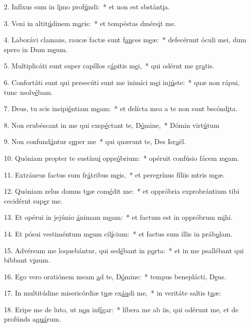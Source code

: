 2. Infíxus sum in l\uline{i}mo prof\uline{ú}ndi:~* et non est sbstánt\uline{i}a.\par 
3. Veni in altit\uline{ú}dinem m\uline{a}ris:~* et tempéstas dmérs\uline{i}t me.\par 
4. Laborávi clamans, raucæ factæ sunt f\uline{au}ces m\uline{e}æ:~* defecérunt óculi mei, dum spero in Dum m\uline{e}um.\par 
5. Multiplicáti sunt super capíllos c\uline{á}pitis m\uline{e}i,~* qui odérnt me gr\uline{a}tis.\par 
6. Confortáti sunt qui persecúti sunt me inimíci m\uline{e}i inj\uline{ú}ste:~* quæ non rápui, tunc xsolv\uline{é}bam.\par 
7. Deus, tu scis insipi\uline{é}ntiam m\uline{e}am:~* et delícta mea a te non sunt bscónd\uline{i}ta.\par 
8. Non erubéscant in me qui exsp\uline{é}ctant te, D\uline{ó}mine,~* Dómin virt\uline{ú}tum\par 
9. Non confund\uline{á}ntur s\uline{u}per me~* qui quærunt te, Des Isr\uline{a}ël.\par 
10. Quóniam propter te sustínu\uline{i} oppr\uline{ó}brium:~* opéruit confúsio fácem m\uline{e}am.\par 
11. Extráneus factus sum fr\uline{á}tribus m\uline{e}is,~* et peregrínus fíliis mtris m\uline{e}æ.\par 
12. Quóniam zelus domus t\uline{u}æ com\uline{é}dit me:~* et oppróbria exprobrántium tibi cecidérnt sup\uline{e}r me.\par 
13. Et opérui in jejúnio \uline{á}nimam m\uline{e}am:~* et factum est in oppróbrum m\uline{i}hi.\par 
14. Et pósui vestiméntum m\uline{e}um cil\uline{í}cium:~* et factus sum illis in práb\uline{o}lam.\par 
15. Advérsum me loquebántur, qui sed\uline{é}bant in p\uline{o}rta:~* et in me psallébant qui bibbant v\uline{i}num.\par 
16. Ego vero oratiónem meam \uline{a}d te, D\uline{ó}mine:~* tempus beneplácti, D\uline{e}us.\par 
17. In multitúdine misericórdiæ t\uline{u}æ ex\uline{áu}di me,~* in veritáte saltis t\uline{u}æ:\par 
18. Eripe me de luto, ut n\uline{o}n inf\uline{í}gar:~* líbera me ab iis, qui odérunt me, et de profúnds a\uline{quá}rum.\par 
